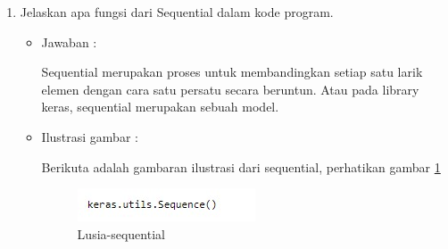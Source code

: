 \begin{enumerate}
\item Jelaskan apa fungsi dari Sequential dalam kode program.
	\begin{itemize}
	\item Jawaban :
		\par Sequential merupakan proses untuk membandingkan setiap satu larik elemen dengan cara satu persatu secara beruntun. Atau pada library keras, sequential merupakan sebuah model.
	\item Ilustrasi gambar :
		\par Berikuta adalah gambaran ilustrasi dari sequential, perhatikan gambar \ref{6A9}
		\begin{figure}[!hbtp]
		\centering
		\includegraphics[scale=0.4]{figures/s8.jpg}
		\caption{Lusia-sequential}
		\label{6A9}
		\end{figure}
	\end{itemize}
\end{enumerate}

